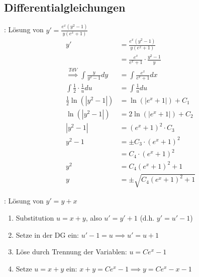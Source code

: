 \subsection{Differentialgleichungen}

\Bsp {}: Lösung von $y' = \frac{e^x(y^2 - 1)}{y(e^x + 1)}$
\vspace{-0.2em}
\begin{align*}
    y' &= \frac{e^x(y^2 - 1)}{y(e^x + 1)} \\[-0.4em]
       &= \frac{e^x}{e^x + 1} \cdot \frac{y^2 - 1}{y} \\[-0.4em]
    \overset{TdV}{\implies} \int \frac{y}{y^2 - 1}dy &= \int \frac{e^x}{e^x + 1}dx \\[-0.3em]
    \int \frac{1}{2} \cdot \frac{1}{u} du &= \int \frac{1}{u} du \\[-0.5em]
    \frac{1}{2}\ln(|y^2 - 1|) &= \ln(|e^x + 1|) + C_1 \\[-0.6em]
    \ln(|y^2 - 1|) &= 2\ln(|e^x + 1|) + C_2 \\[-0.6em]
    |y^2 - 1| &= (e^x + 1)^2 \cdot C_3 \\[-0.6em]
    y^2 - 1 &= \pm C_3 \cdot (e^x + 1)^2 \\[-0.6em]
            &= C_4 \cdot (e^x + 1)^2 \\[-0.6em]
    y^2 &= C_4 (e^x + 1)^2 + 1 \\[-0.6em]
    y &= \pm \sqrt{C_4 (e^x + 1)^2 + 1}
\end{align*}

\begin{minipage}{\linewidth}
\Bsp {}: Lösung von $y' = y + x$
\begin{enumerate}
    \item Substitution $u = x + y$, also $u' = y' + 1$ (d.h. $y' = u' - 1$)
    \item Setze in der DG ein: $u' - 1 = u \implies u' = u + 1$
    \item Löse durch Trennung der Variablen: $u = Ce^x - 1$
    \item Setze $u = x + y$ ein: $x + y = Ce^x - 1 \implies y = Ce^x - x - 1$
\end{enumerate}
\end{minipage}

